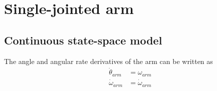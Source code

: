 \section{Single-jointed arm}
\label{sec:ss_model_single-jointed_arm}

\subsection{Continuous state-space model}

The angle and angular rate derivatives of the arm can be written as
\begin{align}
  \dot{\theta}_{arm} &= \omega_{arm} \\
  \dot{\omega}_{arm} &= \dot{\omega}_{arm}
\end{align}

